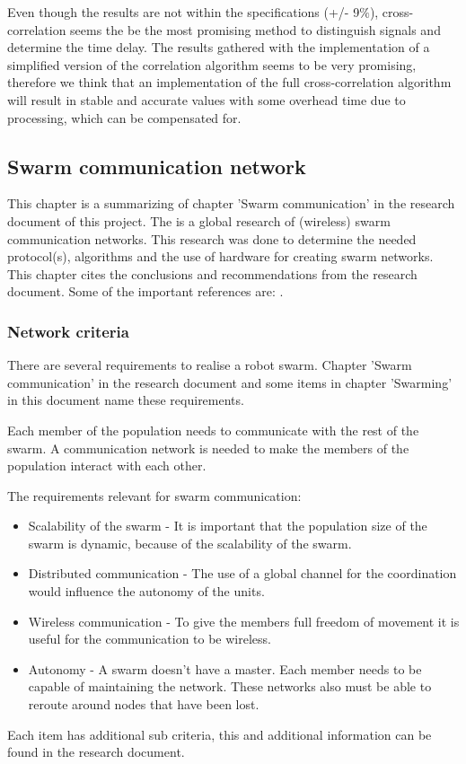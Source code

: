 \documentclass[10pt,a4paper]{article}
\begin{document}
Even though the results are not within the specifications (+/- 9$\%$), cross-correlation seems the be the most promising method to distinguish signals and determine the time delay. The results gathered with the implementation of a simplified version of the correlation algorithm seems to be very promising, therefore we think that an implementation of the full cross-correlation algorithm will result in stable and accurate values with some overhead time due to processing, which can be compensated for.


\subsection{Swarm communication network}
This chapter is a summarizing of chapter 'Swarm communication' in the research document of this project. The is a global research of (wireless) swarm communication networks. This research was done to determine the needed protocol(s), algorithms and the use of hardware for creating swarm networks. This chapter cites the conclusions and recommendations from the research document. Some of the important references are: \cite{combook} \cite{multi-hopwirelessnetworks} \cite{meshnetworking} \cite{position-based}.

\subsubsection{Network criteria}
There are several requirements to realise a robot swarm. Chapter 'Swarm communication' in the research document and some items in chapter 'Swarming' in this document name these requirements. 

Each member of the population needs to communicate with the rest of the swarm. A communication network is needed to make the members of the population interact with each other.

The requirements relevant for swarm communication:
\begin{itemize}
\setlength\itemsep{0em}
    \item Scalability of the swarm - It is important that the population size of the swarm is
    dynamic, because of the scalability of the swarm.
    \item Distributed communication - The use of a global channel for the coordination would influence the autonomy of the units.\cite{swarmintelligence}
    \item Wireless communication - To give the members full freedom of movement it is useful for the   communication to be wireless.
    \item Autonomy - A swarm doesn't have a master. Each member needs to be capable of maintaining the  network. These networks also must be able to reroute around nodes that have
    been lost.
\end{itemize}
Each item has additional sub criteria, this and additional information can be found in the research document.
\end{document}
